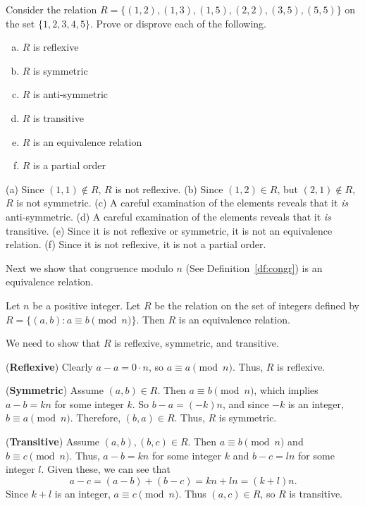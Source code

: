 \begin{exer}
Consider the relation 
$R=\{(1,2), (1,3), (1,5), (2,2), (3,5), (5,5)\}$ on the set $\{1,2,3,4,5\}$.
Prove or disprove each of the following.
\begin{enumerate}[(a)]
\item $R$ is reflexive

\noindent \answerlinetwo
\item $R$ is symmetric

\noindent \answerlinetwo
\item $R$ is anti-symmetric

\noindent \answerlinetwo
\item $R$ is transitive

\noindent \answerlinetwo
\item $R$ is an equivalence relation

\noindent \answerlinetwo
\item $R$ is a partial order

\noindent \answerlinetwo
\end{enumerate}
\begin{answer}
(a) Since $(1,1)\not\in R$, $R$ is not reflexive.
(b) Since $(1,2)\in R$, but $(2,1)\not\in R$, $R$ is not symmetric.
(c) A careful examination of the elements reveals that it {\em is} anti-symmetric.
(d) A careful examination of the elements reveals that it {\em is} transitive.
(e) Since it is not reflexive or symmetric, it is not an equivalence relation.
(f) Since it is not reflexive, it is not a partial order.
\end{answer}
\end{exer}

Next we show that congruence modulo $n$ (See Definition~\ref{df:congr}) is an equivalence relation.

\begin{thm}
Let $n$ be a positive integer.  Let $R$ be the relation on the set of integers
defined by $R=\{(a,b):a\equiv b \pmod n\}$. Then $R$ is an equivalence relation.
\begin{pf}
We need to show that $R$ is reflexive, symmetric, and transitive.

\noindent
({\bf Reflexive})
Clearly $a-a=0\cdot n$, so $a\equiv a\pmod n$.  Thus, $R$ is reflexive.

\noindent
({\bf Symmetric})
Assume $(a,b)\in R$.   Then $a\equiv b\pmod n$, which implies $a-b=kn$ for some integer $k$.  
So $b-a=(-k)n$, and since $-k$ is an integer, $b\equiv a\pmod n$.  Therefore, $(b,a)\in R$.  
Thus, $R$ is symmetric.

\noindent
({\bf Transitive})
Assume $(a,b), (b,c)\in R$.  Then 
$a\equiv b\pmod n$ and
$b\equiv c\pmod n$.
Thus,  $a-b=kn$ for some integer $k$ and 
$b-c=ln$ for some integer $l$. 
Given these, we can see that 
$$a-c = (a-b) + (b-c) = kn + ln = (k+l)n.$$
Since $k+l$ is an integer,  $a\equiv c \pmod n$. 
Thus $(a,c)\in R$, so  $R$ is transitive.
\end{pf}
\end{thm}

